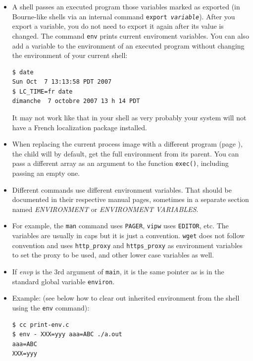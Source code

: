 \begin{itemize}
\item A shell passes an executed program those variables marked as exported
(in Bourne-like shells via an internal command \texttt{export \emph{variable}}).
After you export a variable, you do not need to export it again after its value
is changed.  The command \texttt{env} prints current enviroment variables.
You can also add a variable to the environment of an executed program without
changing the environment of your current shell:

\begin{verbatim}
$ date
Sun Oct  7 13:13:58 PDT 2007
$ LC_TIME=fr date
dimanche  7 octobre 2007 13 h 14 PDT
\end{verbatim}

It may not work like that in your shell as very probably your system will not
have a French localization package installed.
\item When replacing the current process image with a different program (page
\pageref{EXEC}), the child will by default, get the full environment from its
parent.  You can pass a different array as an argument to the function
\texttt{exec()}, including passing an empty one.
\item Different commands use different environment variables.  That should be
documented in their respective manual pages, sometimes in a separate section
named \emph{ENVIRONMENT} or \emph{ENVIRONMENT VARIABLES}.
\item For example, the \texttt{man} command uses \texttt{PAGER}, \texttt{vipw}
uses \texttt{EDITOR}, etc.  The variables are usually in caps but it is just a
convention.  \texttt{wget} does not follow convention and uses
\texttt{http\_proxy} and \texttt{https\_proxy} as environment variables to set
the proxy to be used, and other lower case variables as well.
\item If \emph{envp} is the 3rd argument of \texttt{main}, it is the same pointer
as is in the standard global variable \texttt{environ}.
\item Example:  (see below how to clear out inherited
environment from the shell using the \texttt{env} command):

\begin{verbatim}
$ cc print-env.c
$ env - XXX=yyy aaa=ABC ./a.out
aaa=ABC
XXX=yyy
\end{verbatim}
\end{itemize}




